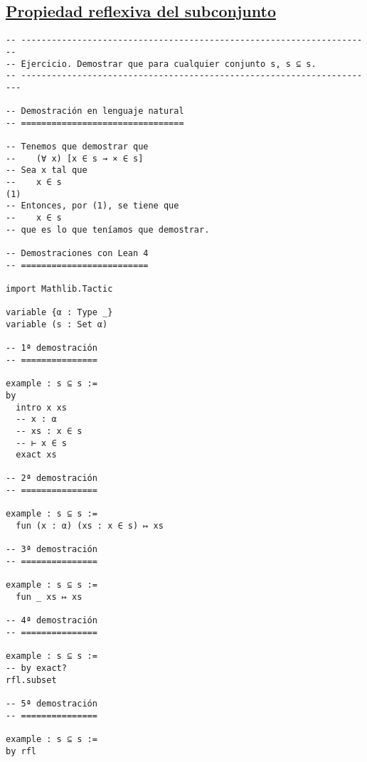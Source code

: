 \subsection{\href{./src/Logica/Propiedad\_reflexiva\_del\_subconjunto.lean}{Propiedad reflexiva del subconjunto}}
\label{sec:org786b5e9}
\begin{verbatim}
-- ---------------------------------------------------------------------
-- Ejercicio. Demostrar que para cualquier conjunto s, s ⊆ s.
-- ----------------------------------------------------------------------

-- Demostración en lenguaje natural
-- ================================

-- Tenemos que demostrar que
--    (∀ x) [x ∈ s → × ∈ s]
-- Sea x tal que
--    x ∈ s                                                          (1)
-- Entonces, por (1), se tiene que
--    x ∈ s
-- que es lo que teníamos que demostrar.

-- Demostraciones con Lean 4
-- =========================

import Mathlib.Tactic

variable {α : Type _}
variable (s : Set α)

-- 1ª demostración
-- ===============

example : s ⊆ s :=
by
  intro x xs
  -- x : α
  -- xs : x ∈ s
  -- ⊢ x ∈ s
  exact xs

-- 2ª demostración
-- ===============

example : s ⊆ s :=
  fun (x : α) (xs : x ∈ s) ↦ xs

-- 3ª demostración
-- ===============

example : s ⊆ s :=
  fun _ xs ↦ xs

-- 4ª demostración
-- ===============

example : s ⊆ s :=
-- by exact?
rfl.subset

-- 5ª demostración
-- ===============

example : s ⊆ s :=
by rfl
\end{verbatim}

